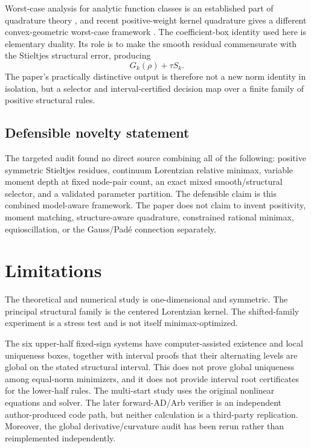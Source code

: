\documentclass[preprint,12pt]{elsarticle}
\theoremstyle{remark}
\begin{document}
Worst-case analysis for analytic function classes is an established
part of quadrature theory \cite{trefethen2022,goda2024}, and recent
positive-weight kernel quadrature gives a different
convex-geometric worst-case framework \cite{hayakawa2026}. The
coefficient-box identity used here is elementary duality. Its role is
to make the smooth residual commensurate with the Stieltjes structural
error, producing
\[
G_k(\rho)+\tau S_k.
\]
The paper's practically distinctive output is therefore not a new norm
identity in isolation, but a selector and interval-certified decision map over a
finite family of positive structural rules.

\subsection{Defensible novelty statement}

The targeted audit found no direct source combining all of the
following: positive symmetric Stieltjes residues, continuum Lorentzian
relative minimax, variable moment depth at fixed node-pair count, an
exact mixed smooth/structural selector, and a validated parameter
partition. The defensible claim is this combined model-aware framework.
The paper does not claim to invent positivity, moment matching,
structure-aware quadrature, constrained rational minimax,
equioscillation, or the Gauss/Pad\'e connection separately.

\section{Limitations}

The theoretical and numerical study is one-dimensional and symmetric.
The principal structural family is the centered Lorentzian kernel. The
shifted-family experiment is a stress test and is not itself
minimax-optimized.

The six upper-half fixed-sign systems have computer-assisted existence
and local uniqueness boxes, together with interval proofs that their
alternating levels are global on the stated structural interval. This
does not prove global uniqueness among equal-norm minimizers, and it
does not provide interval root certificates for the lower-half rules.
The multi-start study uses the original nonlinear equations and solver.
The later forward-AD/Arb verifier is an independent author-produced code
path, but neither calculation is a third-party replication. Moreover,
the global derivative/curvature audit has been rerun rather than
reimplemented independently.
\end{document}

